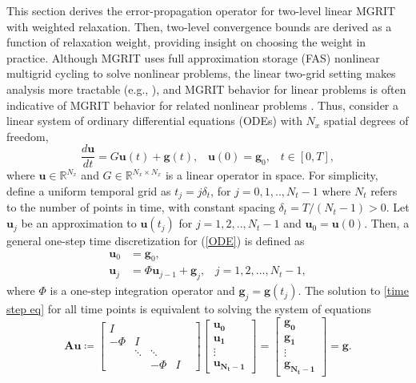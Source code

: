 \documentclass[VANCOUVER,STIX1COL]{WileyNJD-v2}
\begin{document}
This section derives the error-propagation operator for two-level linear MGRIT with weighted relaxation. Then, two-level convergence bounds are derived as a function of relaxation weight, providing insight on choosing the weight in practice. Although MGRIT uses full approximation storage (FAS) nonlinear multigrid cycling \cite{Brandt_1977} to solve nonlinear problems, the linear two-grid setting makes analysis more tractable (e.g.,  \cite{FriMac2015, Do2016, HeSoNoRoFaSc2018, So2019, FrSo2020}), and MGRIT behavior for linear problems is often indicative of MGRIT behavior for related nonlinear problems \cite{Do2016}. Thus, consider a linear system of ordinary differential equations (ODEs) with $N_x$ spatial degrees of freedom,
\begin{equation}\label{ODE}
\frac{d \mathbf{u}}{dt} = G\mathbf{u}(t) + \mathbf{g}(t), \hspace{10pt} \mathbf{u}(0)=\mathbf{g}_0, \hspace{10pt} t \in [0, T],
\end{equation}
where $\mathbf{u} \in \mathbb{R}^{N_x}$ and $G\in\mathbb{R}^{N_x\times N_x}$ is a linear operator in space. For simplicity, define a uniform temporal grid as $t_j = j \delta_t$, for $j=0,1,..,N_t-1$ where $N_t$ refers to the number of points in time, with constant spacing $\delta_t = T / (N_t - 1) > 0$. Let $\mathbf{u}_{j}$ be an approximation to $\mathbf{u}(t_j)$ for $j=1,2,..,N_t-1$ and $\mathbf{u}_0 = \mathbf{u}(0)$. Then, a general one-step time discretization for (\ref{ODE}) is defined as
\begin{equation}\label{time step eq}
\begin{aligned}
\mathbf{u}_0 &= \mathbf{g}_0,\\
\mathbf{u}_j &= \Phi \mathbf{u}_{j-1} + \mathbf{g}_j, \hspace{10pt} j=1,2,...,N_t-1 ,
\end{aligned}
\end{equation}
{where $\Phi$ is a one-step integration operator and $\mathbf{g}_j = \mathbf{g}(t_j)$.}
The solution to \eqref{time step eq} for all time points is equivalent to solving the system of equations
\begin{equation}\label{time step eq matrix}
\mathbf{Au} \coloneqq 
\begin{bmatrix} 
I &  &  &  & \\
-\Phi & I &  &  &\\
& \ddots &  \ddots&  & \\
& & -\Phi & I
\end{bmatrix}
\begin{bmatrix}
\mathbf{u_0}\\ \mathbf{u_1} \\ \vdots \\ \mathbf{u_{N_t-1}}
\end{bmatrix}=
\begin{bmatrix}
\mathbf{g_0}\\ \mathbf{g_1} \\ \vdots \\ \mathbf{g_{N_t-1}}
\end{bmatrix} = \mathbf{g}.
\end{equation}
\end{document}
